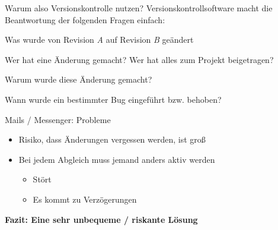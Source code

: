 \begin{frame}[c]{Warum also Versionskontrolle nutzen?}
  Versionskontrollsoftware macht die Beantwortung der folgenden Fragen einfach:
  \begin{description}[Warum?]
    \item[Was?] Was wurde von Revision \emph{A} auf Revision \emph{B} geändert
    \item[Wer?] Wer hat eine Änderung gemacht? Wer hat alles zum Projekt beigetragen?
    \item[Warum?] Warum wurde diese Änderung gemacht?
    \item[Wann?] Wann wurde ein bestimmter Bug eingeführt bzw. behoben?
  \end{description}

\end{frame}



\begin{frame}{Mails / Messenger: Probleme}
  \centering
  \begin{itemize}
    \item Risiko, dass Änderungen vergessen werden, ist groß
    \item Bei jedem Abgleich muss jemand anders aktiv werden
      \begin{itemize}
        \item Stört
        \item Es kommt zu Verzögerungen
      \end{itemize}
  \end{itemize}
  \textbf{\Large Fazit: Eine sehr unbequeme / riskante Lösung}
\end{frame}


